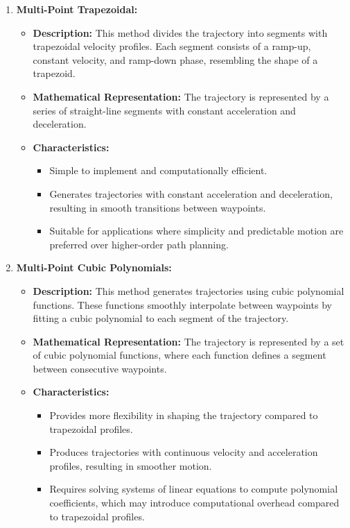 \documentclass[conference]{IEEEtran}
\begin{document}
\begin{enumerate}
    \item \textbf{Multi-Point Trapezoidal:}
          \begin{itemize}
              \item \textbf{Description:} This method divides the trajectory into segments with trapezoidal velocity profiles. Each segment consists of a ramp-up, constant velocity, and ramp-down phase, resembling the shape of a trapezoid.
              \item \textbf{Mathematical Representation:} The trajectory is represented by a series of straight-line segments with constant acceleration and deceleration.
              \item \textbf{Characteristics:}
                    \begin{itemize}
                        \item Simple to implement and computationally efficient.
                        \item Generates trajectories with constant acceleration and deceleration, resulting in smooth transitions between waypoints.
                        \item Suitable for applications where simplicity and predictable motion are preferred over higher-order path planning.
                    \end{itemize}
          \end{itemize}

    \item \textbf{Multi-Point Cubic Polynomials:}
          \begin{itemize}
              \item \textbf{Description:} This method generates trajectories using cubic polynomial functions. These functions smoothly interpolate between waypoints by fitting a cubic polynomial to each segment of the trajectory.
              \item \textbf{Mathematical Representation:} The trajectory is represented by a set of cubic polynomial functions, where each function defines a segment between consecutive waypoints.
              \item \textbf{Characteristics:}
                    \begin{itemize}
                        \item Provides more flexibility in shaping the trajectory compared to trapezoidal profiles.
                        \item Produces trajectories with continuous velocity and acceleration profiles, resulting in smoother motion.
                        \item Requires solving systems of linear equations to compute polynomial coefficients, which may introduce computational overhead compared to trapezoidal profiles.
                    \end{itemize}
          \end{itemize}


\end{enumerate}
\end{document}
